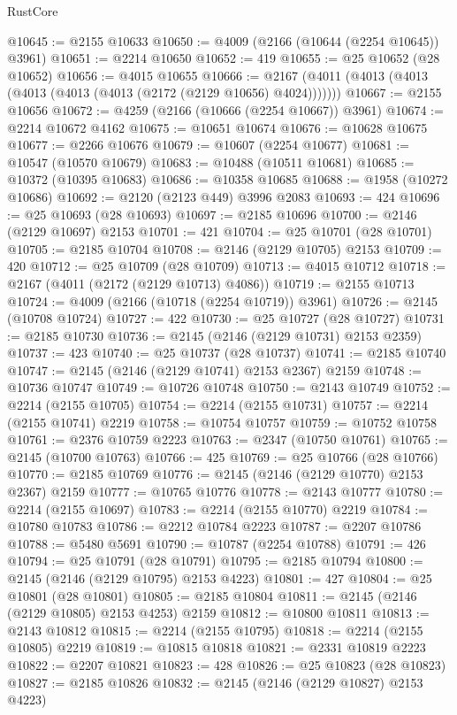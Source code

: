 \begin{lexlean}{RustCore}
\begin{coremodule}
@10645 := @2155 @10633
@10650 := @4009 (@2166 (@10644 (@2254 @10645)) @3961)
@10651 := @2214 @10650
@10652 := 419
@10655 := @25 @10652 (@28 @10652)
@10656 := @4015 @10655
@10666 := @2167 (@4011 (@4013 (@4013 (@4013 (@4013 (@4013 (@2172 (@2129 @10656) @4024)))))))
@10667 := @2155 @10656
@10672 := @4259 (@2166 (@10666 (@2254 @10667)) @3961)
@10674 := @2214 @10672 @4162
@10675 := @10651 @10674
@10676 := @10628 @10675
@10677 := @2266 @10676
@10679 := @10607 (@2254 @10677)
@10681 := @10547 (@10570 @10679)
@10683 := @10488 (@10511 @10681)
@10685 := @10372 (@10395 @10683)
@10686 := @10358 @10685
@10688 := @1958 (@10272 @10686)
@10692 := @2120 (@2123 @449) @3996 @2083
@10693 := 424
@10696 := @25 @10693 (@28 @10693)
@10697 := @2185 @10696
@10700 := @2146 (@2129 @10697) @2153
@10701 := 421
@10704 := @25 @10701 (@28 @10701)
@10705 := @2185 @10704
@10708 := @2146 (@2129 @10705) @2153
@10709 := 420
@10712 := @25 @10709 (@28 @10709)
@10713 := @4015 @10712
@10718 := @2167 (@4011 (@2172 (@2129 @10713) @4086))
@10719 := @2155 @10713
@10724 := @4009 (@2166 (@10718 (@2254 @10719)) @3961)
@10726 := @2145 (@10708 @10724)
@10727 := 422
@10730 := @25 @10727 (@28 @10727)
@10731 := @2185 @10730
@10736 := @2145 (@2146 (@2129 @10731) @2153 @2359)
@10737 := 423
@10740 := @25 @10737 (@28 @10737)
@10741 := @2185 @10740
@10747 := @2145 (@2146 (@2129 @10741) @2153 @2367) @2159
@10748 := @10736 @10747
@10749 := @10726 @10748
@10750 := @2143 @10749
@10752 := @2214 (@2155 @10705)
@10754 := @2214 (@2155 @10731)
@10757 := @2214 (@2155 @10741) @2219
@10758 := @10754 @10757
@10759 := @10752 @10758
@10761 := @2376 @10759 @2223
@10763 := @2347 (@10750 @10761)
@10765 := @2145 (@10700 @10763)
@10766 := 425
@10769 := @25 @10766 (@28 @10766)
@10770 := @2185 @10769
@10776 := @2145 (@2146 (@2129 @10770) @2153 @2367) @2159
@10777 := @10765 @10776
@10778 := @2143 @10777
@10780 := @2214 (@2155 @10697)
@10783 := @2214 (@2155 @10770) @2219
@10784 := @10780 @10783
@10786 := @2212 @10784 @2223
@10787 := @2207 @10786
@10788 := @5480 @5691
@10790 := @10787 (@2254 @10788)
@10791 := 426
@10794 := @25 @10791 (@28 @10791)
@10795 := @2185 @10794
@10800 := @2145 (@2146 (@2129 @10795) @2153 @4223)
@10801 := 427
@10804 := @25 @10801 (@28 @10801)
@10805 := @2185 @10804
@10811 := @2145 (@2146 (@2129 @10805) @2153 @4253) @2159
@10812 := @10800 @10811
@10813 := @2143 @10812
@10815 := @2214 (@2155 @10795)
@10818 := @2214 (@2155 @10805) @2219
@10819 := @10815 @10818
@10821 := @2331 @10819 @2223
@10822 := @2207 @10821
@10823 := 428
@10826 := @25 @10823 (@28 @10823)
@10827 := @2185 @10826
@10832 := @2145 (@2146 (@2129 @10827) @2153 @4223)

\end{coremodule}
\end{lexlean}
